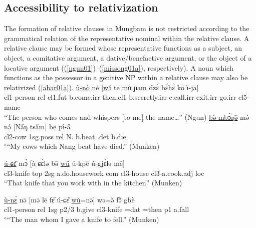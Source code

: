 \documentclass[10pt,twoside]{article}
\makeatletter
\newcommand{\cl}[1]{{\sc cl#1}}
\def\elicited{$^\diamond$}
\def\ML#1{#1\symbol{"1DC6}} %
\renewcommand{\i}{ı}
\def\@{ə}
\def\eh{ɛ}
\def\aw{ɔ}
\def\ng{ŋ}
\def\ny{ɲ}
\def\sh{ɕ}
\def\j{j}
\makeatother
\begin{document}
\subsection{Accessibility to relativization}\label{secMungbamAccessibility}
%

The formation of relative clauses in Mungbam is
not restricted according to the grammatical relation of the
representative nominal within the relative clause.
A relative clause may be formed whose representative
functions as a subject, an object, a comitative argument,
a dative/benefactive argument, or the object of a locative
argument ((\ref{ngun01})--(\ref{missong01a}), respectively).
A noun which functions as the possessor in a genitive NP within
a relative clause may also be relativized (\ref{abar01a}).
%
	\ea	\label{ngun01}
	\gll \uline{\`u-n\`o} n\'e $[$\uline{w\v{\@}} t\ML{e} m\`u \ny\ML{a}m dz\'{\eh} b\'{\eh}h\`{\eh} k\={o} \`\i-j\=a$]$	\\
	\cl1-person {\sc rel} \cl1.{\sc fut} b.come.{\sc irr} then.\cl1 b.secretly.{\sc irr} c.call.{\sc irr}
	exit.{\sc irr} {go}.{\sc irr} \cl5-name	\\
	\glt ``The person who comes and whispers [to me] the name\dots'' (Ngun) %
\z
	\ea	\label{biya01a}
	\gll \uline{b\`{\@}-mb\`{\aw}\ng{\=\@}} m\'{\@} n\'{\@} $[$N\H{a}{\ng} ts\H{a}m$]$ b\=e {p\'\i-\H{a}}	\\
	\cl2-cow {\sc 1sg.poss} {\sc rel} N. b.beat {\sc \cl2.det} b.die	\\
	\glt \elicited``My cows which Nang beat have died.'' (Munken) %
\z
        \ea \label{munken03}

        \gll \uline{\'u-{\sh}\H{\eh}} m\`{\aw} $[$\`a {\sh}\`{\eh}l{\@} b\={\@} \uline{w\H{u}} \'u-kp\H{e} \'u-g{\j}\`{\eh}l{\@} m\=e$]$        \\
        \cl3-knife {\sc top} {\sc 2sg} {a.do.housework} {\sc com} {\sc \cl3} \cl3-house \cl3-a.cook.{\sc adj} {\sc loc}     \\
        \glt ``That knife that you work with in the kitchen'' (Munken)  %
\z

	\ea     \label{munken10}

        \gll \uline{\`u-n\`{\eh}} n\={\@} $[$m\={\@} l\=e f\H{\eh} \'u-{\sh}\H{\eh} \uline{w\`u}=n\={\@}$]$ w{\@}=\v{\@}
        f\H{\@} gb\`e   \\
        \cl1-person {\sc rel} {\sc 1sg} {\sc p2/3} b.give \cl3-knife {\sc \cl1=dat} {=}then
        {\sc p1} a.fall \\
        \glt \elicited``The man whom I gave a knife to fell.'' (Munken) %
\z
\end{document}
